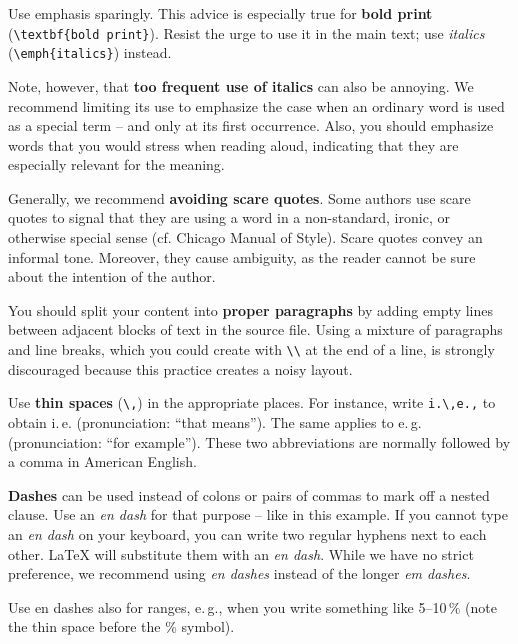 Use emphasis sparingly. This advice is especially true for \textbf{bold print} (\verb|\textbf{bold print}|). Resist the urge to use it in the main text; use \emph{italics} (\verb|\emph{italics}|) instead.

Note, however, that \textbf{too frequent use of italics} can also be annoying.%
We recommend limiting its use to emphasize the case when an ordinary word is used as a special term – and only at its first occurrence. Also, you should emphasize words that you would stress when reading aloud, indicating that they are especially relevant for the meaning.


Generally, we recommend \textbf{avoiding scare quotes}.%
Some authors use scare quotes to signal that they are using a word in a non-standard, ironic, or otherwise special sense (cf. Chicago Manual of Style). Scare quotes convey an informal tone. Moreover, they cause ambiguity, as the reader cannot be sure about the intention of the author.

You should split your content into \textbf{proper paragraphs} by adding empty lines between adjacent blocks of text in the source file. Using a mixture of paragraphs and line breaks, which you could create with \verb|\\| at the end of a line, is strongly discouraged because this practice creates a noisy layout.

Use \textbf{thin spaces} (\verb|\,|) in the appropriate places. For instance, write \verb|i.\,e.,| to obtain i.\,e. (pronunciation: ``that means''). The same applies to e.\,g. (pronunciation: ``for example''). These two abbreviations are normally followed by a comma in American English.

\textbf{Dashes} can be used instead of colons or pairs of commas to mark off a nested clause. Use an \emph{en dash} for that purpose -- like in this example. If you cannot type an \emph{en dash} on your keyboard, you can write two regular hyphens next to each other. LaTeX will substitute them with an \emph{en dash}. While we have no strict preference, we recommend using \emph{en dashes} instead of the longer \emph{em dashes}.

Use en dashes also for ranges, e.\,g., when you write something like 5--10\,\% (note the thin space before the \% symbol).

